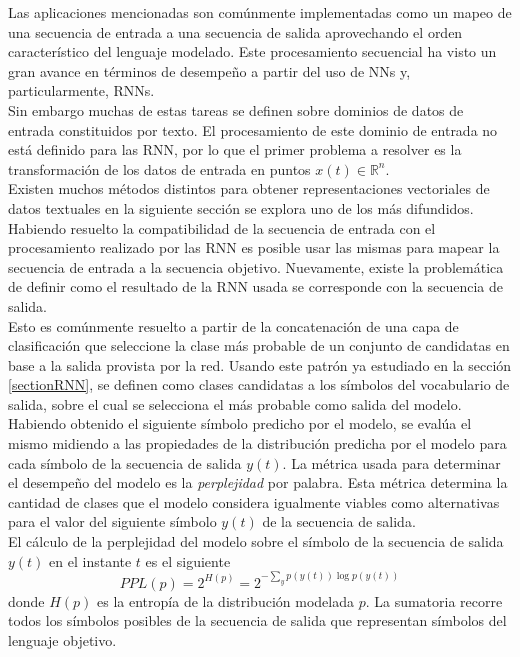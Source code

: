 \documentclass{article}
\begin{document}
	Las aplicaciones mencionadas son comúnmente implementadas como un mapeo de una secuencia de entrada a una secuencia de salida aprovechando el orden característico del lenguaje modelado. Este procesamiento secuencial ha visto un gran avance en términos de desempeño a partir del uso de NNs y, particularmente, RNNs.\\
	Sin embargo muchas de estas tareas se definen sobre dominios de datos de entrada constituidos por texto. El procesamiento de este dominio de entrada no está definido para las RNN, por lo que el primer problema a resolver es la transformación de los datos de entrada en puntos $x(t) \in \mathbb{R}^n$.\\
	Existen muchos métodos distintos para obtener representaciones vectoriales de datos textuales en la siguiente sección se explora uno de los más difundidos.\\
	Habiendo resuelto la compatibilidad de la secuencia de entrada con el procesamiento realizado por las RNN es posible usar las mismas para mapear la secuencia de entrada a la secuencia objetivo. Nuevamente, existe la problemática de definir como el resultado de la RNN usada se corresponde con la secuencia de salida.\\
	Esto es comúnmente resuelto a partir de la concatenación de una capa de clasificación que seleccione la clase más probable de un conjunto de candidatas en base a la salida provista por la red. Usando este patrón ya estudiado en la sección \ref{sectionRNN}, se definen como clases candidatas a los símbolos del vocabulario de salida, sobre el cual se selecciona el más probable como salida del modelo.\\
	
	Habiendo obtenido el siguiente símbolo predicho por el modelo, se evalúa el mismo midiendo a las propiedades de la distribución predicha por el modelo para cada símbolo de la secuencia de salida $y(t)$. La métrica usada para determinar el desempeño del modelo es la \textit{perplejidad} por palabra. Esta métrica determina la cantidad de clases que el modelo considera igualmente viables como alternativas para el valor del siguiente símbolo $y(t)$ de la secuencia de salida.\\
	El cálculo de la perplejidad del modelo sobre el símbolo de la secuencia de salida $y(t)$ en el instante $t$ es el siguiente
	\begin{equation*}
	PPL(p)=2^{H(p)} = 2^{-\sum_{y} p(y(t))\log p(y(t))}
	\end{equation*}
	donde $H(p)$ es la entropía de la distribución modelada $p$. La sumatoria recorre todos los símbolos posibles de la secuencia de salida que representan símbolos del lenguaje objetivo.\\
	
\end{document}
